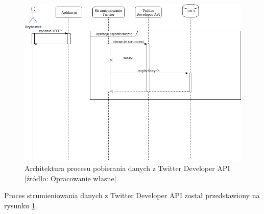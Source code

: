 \begin{figure}
	\centering
	\includegraphics[scale=0.5]{twitter-api-connection.png}
	\caption{Architektura procesu pobierania danych z Twitter Developer API [źródło: Opracowanie własne].}
	\label{fig:@=twitter-api-connection}
\end{figure}
Proces strumieniowania danych z Twitter Developer API został przedstawiony na rysunku \ref{fig:@=twitter-api-connection}.
